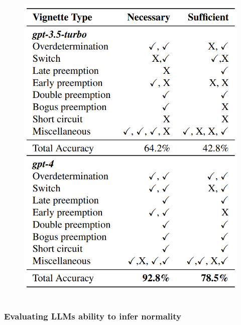 \documentclass{beamer}
\begin{document}
\begin{frame}
\begin{columns}
\begin{column}{0.5\textwidth}
\begin{figure}
				\includegraphics[scale=0.15]{imgs/table_11_12.png}
			\end{figure}
		\end{column}
	\end{columns}
\end{frame}

\begin{frame}
	\frametitle{Evaluating LLMs ability to infer normality}

\end{frame}
\end{document}
